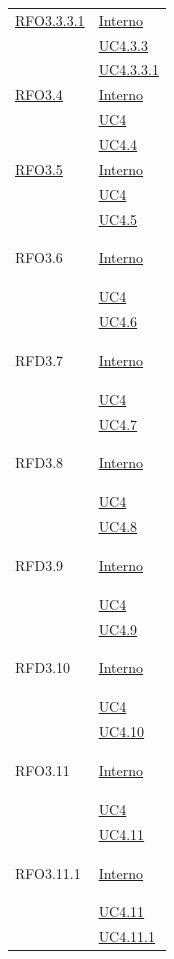 \begin{longtable}{|>{\centering}m{5cm}|m{5cm}<{\centering}|}
\hyperlink{RFO3.3.3.1}{RFO3.3.3.1} & \hyperlink{Interno}{Interno}\\
& \hyperref[UC4.3.3]{UC4.3.3}\\
& \hyperref[UC4.3.3.1]{UC4.3.3.1}\\ \hline

\hyperlink{RFO3.4}{RFO3.4} & \hyperlink{Interno}{Interno}\\
& \hyperref[UC4]{UC4}\\
& \hyperref[UC4.4]{UC4.4}\\ \hline

\hyperlink{RFO3.5}{RFO3.5} & \hyperlink{Interno}{Interno}\\
& \hyperref[UC4]{UC4}\\
& \hyperref[UC4.5]{UC4.5}\\ \hline

\hypertarget{RFO3.6}{RFO3.6} & \hyperlink{Interno}{Interno}\\
&\hyperref[UC4]{UC4}\\
&\hyperref[UC4.6]{UC4.6}\\ \hline

\hypertarget{RFD3.7}{RFD3.7} & \hyperlink{Interno}{Interno}\\
& \hyperref[UC4]{UC4}\\
& \hyperref[UC4.7]{UC4.7}\\ \hline

\hypertarget{RFD3.8}{RFD3.8} & \hyperlink{Interno}{Interno}\\
& \hyperref[UC4]{UC4}\\
& \hyperref[UC4.8]{UC4.8}\\ \hline

\hypertarget{RFD3.9}{RFD3.9} & \hyperlink{Interno}{Interno}\\
& \hyperref[UC4]{UC4}\\
& \hyperref[UC4.9]{UC4.9}\\ \hline

\hypertarget{RFD3.10}{RFD3.10} & \hyperlink{Interno}{Interno}\\
& \hyperref[UC4]{UC4}\\
& \hyperref[UC4.10]{UC4.10}\\ \hline

\hypertarget{RFO3.11}{RFO3.11} & \hyperlink{Interno}{Interno}\\
& \hyperref[UC4]{UC4}\\
& \hyperref[UC4.11]{UC4.11}\\ \hline

\hypertarget{RFO3.11.1}{RFO3.11.1} & \hyperlink{Interno}{Interno}\\
& \hyperref[UC4.11]{UC4.11}\\
& \hyperref[UC4.11.1]{UC4.11.1}\\ \hline


\end{longtable}

